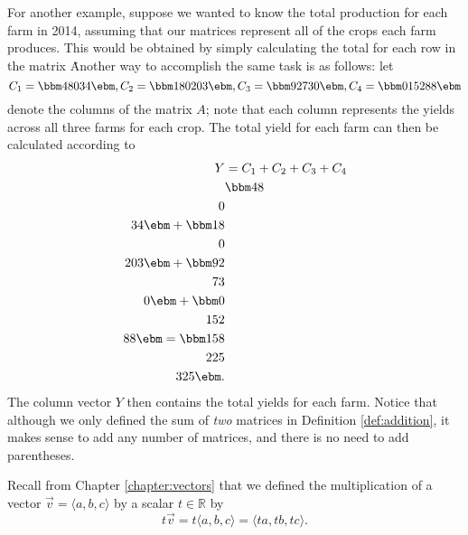 For another example, suppose we wanted to know the total production for each farm in 2014, assuming that our matrices represent all of the crops each farm produces. This would be obtained by simply calculating the total for each row in the matrix \tta\. Another way to accomplish the same task is as follows: let
\[
C_1 = \bbm 48\\0\\34\ebm, C_2 = \bbm 18\\0\\203\ebm, C_3 = \bbm 92\\73\\0\ebm, C_4 = \bbm 0\\152\\88\ebm
\]
denote the columns of the matrix $A$; note that each column represents the yields across all three farms for each crop. The total yield for each farm can then be calculated according to
\begin{align*}
Y & = C_1+C_2+C_3+C_4\\
 & \bbm 48\\0\\34\ebm + \bbm 18\\0\\203\ebm + \bbm 92\\73\\0\ebm + \bbm 0\\152\\88\ebm = \bbm 158\\225\\325\ebm.
\end{align*}
The column vector $Y$ then contains the total yields for each farm. Notice that although we only defined the sum of \textit{two} matrices in Definition \ref{def:addition}, it makes sense to add any number of matrices, and there is no need to add parentheses.

Recall from Chapter \ref{chapter:vectors} that we defined the multiplication of a vector $\vec{v} = \langle a, b, c\rangle$ by a scalar $t\in\mathbb{R}$ by
\[
t\vec{v} = t\langle a, b, c\rangle = \langle ta, tb, tc\rangle.
\]


